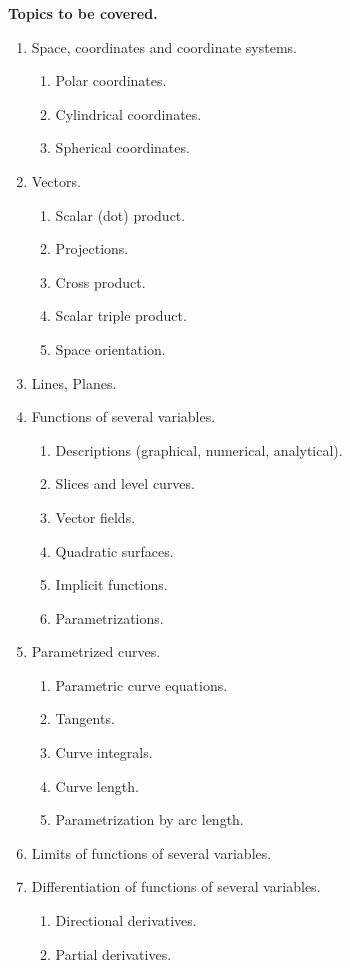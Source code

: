 \documentclass{article}
\begin{document}
\medskip
\noindent \textbf{Topics to be covered.} 
\renewcommand{\theenumii}{\arabic{enumii}}
\begin{enumerate}
\item Space, coordinates and coordinate systems.
\begin{enumerate}
\item Polar coordinates. 
\item Cylindrical coordinates.
\item Spherical coordinates.
\end{enumerate}
\item Vectors.
\begin{enumerate}
\item Scalar (dot) product.
\item Projections.
\item Cross product.
\item Scalar triple product.
\item Space orientation.
\end{enumerate}
\item Lines, Planes.
\item Functions of several variables.
\begin{enumerate}
\item Descriptions (graphical, numerical, analytical).
\item Slices and level curves.
\item Vector fields.
\item Quadratic surfaces.
\item Implicit functions.
\item Parametrizations.
\end{enumerate}
\item Parametrized curves.
\begin{enumerate}
\item Parametric curve equations.
\item Tangents.
\item Curve integrals.
\item Curve length.
\item Parametrization by arc length.
\end{enumerate}
\item Limits of functions of several variables.
\item Differentiation of functions of several variables.
\begin{enumerate}
\item Directional derivatives.
\item Partial derivatives.

\end{enumerate}
\end{enumerate}
\end{document}
